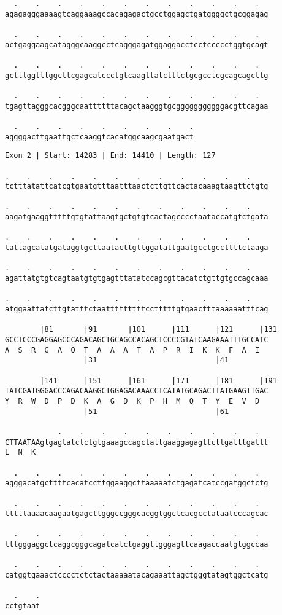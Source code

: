 \documentclass{article}
\begin{document}
\begin{Verbatim}
  .    .    .    .    .    .    .    .    .    .    .    .  
agagagggaaaagtcaggaaagccacagagactgcctggagctgatggggctgcggagag
  
  .    .    .    .    .    .    .    .    .    .    .    .  
actgaggaagcatagggcaaggcctcagggagatggaggacctcctccccctggtgcagt
  
  .    .    .    .    .    .    .    .    .    .    .    .  
gctttggtttggcttcgagcatccctgtcaagttatctttctgcgcctcgcagcagcttg
  
  .    .    .    .    .    .    .    .    .    .    .    .  
tgagttagggcacgggcaattttttacagctaagggtgcgggggggggggacgttcagaa
  
  .    .    .    .    .    .    .    .    .
aggggacttgaattgctcaaggtcacatggcaagcgaatgact
\end{Verbatim}
\newpage
\begin{Verbatim}
Exon 2 | Start: 14283 | End: 14410 | Length: 127
 
.    .    .    .    .    .    .    .    .    .    .    .    
tctttatattcatcgtgaatgtttaatttaactcttgttcactacaaagtaagttctgtg
  
.    .    .    .    .    .    .    .    .    .    .    .    
aagatgaaggtttttgtgtattaagtgctgtgtcactagcccctaataccatgtctgata
  
.    .    .    .    .    .    .    .    .    .    .    .    
tattagcatatgataggtgcttaatacttgttggatattgaatgcctgccttttctaaga
  
.    .    .    .    .    .    .    .    .    .    .    .    
agattatgtgtcagtaatgtgtgagtttatatccagcgttacatctgttgtgccagcaaa
  
.    .    .    .    .    .    .    .    .    .    .    .    
atggaattatcttgtatttctaatttttttttcctttttgtgaactttaaaaaatttcag
  
        |81       |91       |101      |111      |121      |131
GCCTCCCGAGGAGCCCAGACAGCTGCAGCCACAGCTCCCCGTATCAAGAAATTTGCCATC
A  S  R  G  A  Q  T  A  A  A  T  A  P  R  I  K  K  F  A  I  
                  |31                           |41         
  
        |141      |151      |161      |171      |181      |191
TATCGATGGGACCCAGACAAGGCTGGAGACAAACCTCATATGCAGACTTATGAAGTTGAC
Y  R  W  D  P  D  K  A  G  D  K  P  H  M  Q  T  Y  E  V  D  
                  |51                           |61         
  
            .    .    .    .    .    .    .    .    .    .  
CTTAATAAgtgagtatctctgtgaaagccagctattgaaggagagttcttgatttgattt
L  N  K                                                     
  
  .    .    .    .    .    .    .    .    .    .    .    .  
agggacatgcttttcacatccttggaaggcttaaaaatctgagatcatccgatggctctg
  
  .    .    .    .    .    .    .    .    .    .    .    .  
tttttaaaacaagaatgagcttgggccgggcacggtggctcacgcctataatcccagcac
  
  .    .    .    .    .    .    .    .    .    .    .    .  
tttgggaggctcaggcgggcagatcatctgaggttgggagttcaagaccaatgtggccaa
  
  .    .    .    .    .    .    .    .    .    .    .    .  
catggtgaaactcccctctctactaaaaatacagaaattagctgggtatagtggctcatg
  
  .    .
cctgtaat
\end{Verbatim}
\end{document}
